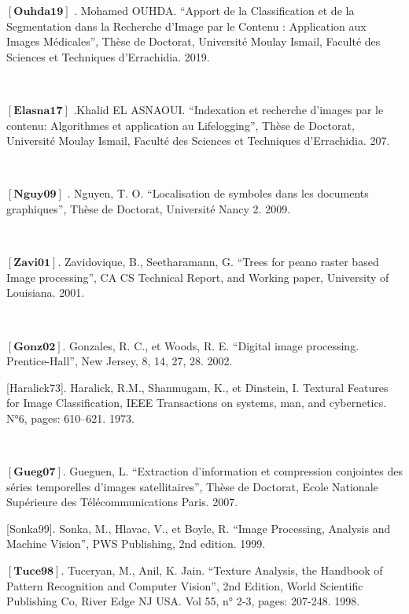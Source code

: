 


 
$\left[\textbf{Ouhda19} \right]$ . Mohamed OUHDA. “Apport de la Classification et de la Segmentation dans la
Recherche d’Image par le Contenu : Application aux
Images Médicales”, Thèse
de Doctorat, Université Moulay Ismail, Faculté des Sciences et Techniques d’Errachidia. 2019.

\

$\left[\textbf{Elasna17} \right]$ .Khalid EL ASNAOUI. “Indexation et recherche d’images par le contenu:
Algorithmes et application au Lifelogging”, Thèse
de Doctorat, Université Moulay Ismail, Faculté des Sciences et Techniques d’Errachidia. 207.

\

$\left[\textbf{Nguy09} \right]$ . Nguyen, T. O. “Localisation de symboles dans les documents graphiques”, Thèse
de Doctorat, Université Nancy 2. 2009.

\

$\left[\textbf{Zavi01}\right]$. Zavidovique, B., Seetharamann, G. “Trees for peano raster based Image processing”, CA CS Technical Report, and Working paper, University of Louisiana. 2001.

\

$\left[\textbf{Gonz02}\right]$. Gonzales, R. C., et Woods, R. E. “Digital image processing. Prentice-Hall”, New
Jersey, 8, 14, 27, 28. 2002.

[Haralick73]. Haralick, R.M., Shanmugam, K., et Dinstein, I. Textural Features for Image
Classification, IEEE Transactions on systems, man, and cybernetics. N°6, pages: 610–621.
1973.

\

$\left[\textbf{Gueg07}\right]$. Gueguen, L. “Extraction d’information et compression conjointes des séries temporelles d’images satellitaires”, Thèse de Doctorat, Ecole Nationale Supérieure des Télécommunications Paris. 2007.

[Sonka99]. Sonka, M., Hlavac, V., et Boyle, R. “Image Processing, Analysis and Machine
Vision”, PWS Publishing, 2nd edition. 1999.
\

$\left[\textbf{Tuce98}\right]$. Tuceryan, M., Anil, K. Jain. “Texture Analysis, the Handbook of Pattern Recognition and Computer Vision”, 2nd Edition, World Scientific Publishing Co, River Edge NJ
USA. Vol 55, n° 2-3, pages: 207-248. 1998.


